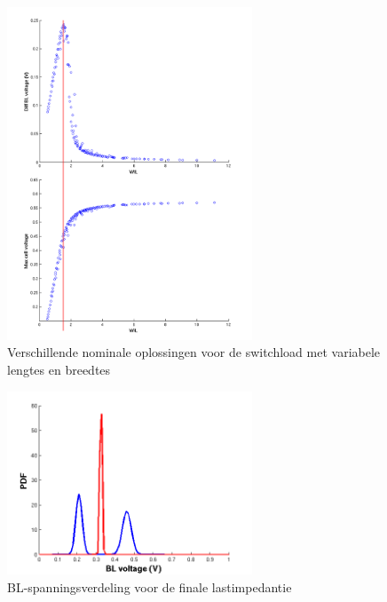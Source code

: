 \begin{figure}[!ht]
  \centering
  \includegraphics[width=0.65\textwidth]{../fig/hfdst-last-length.png}
  \caption[Sweep switchload over transistor lengte en breedte]{Verschillende nominale oplossingen voor de switchload met variabele lengtes en breedtes}
  \label{fig:length}
\end{figure}

\begin{figure}[!ht]
  \centering
  \includegraphics[width=0.65\textwidth]{../fig/hfdst-last-var2.png}
  \caption[BL-spanningsverdeling voor de finale lastimpedantie]{BL-spanningsverdeling voor de finale lastimpedantie}
  \label{fig:distswitch}
\end{figure}

